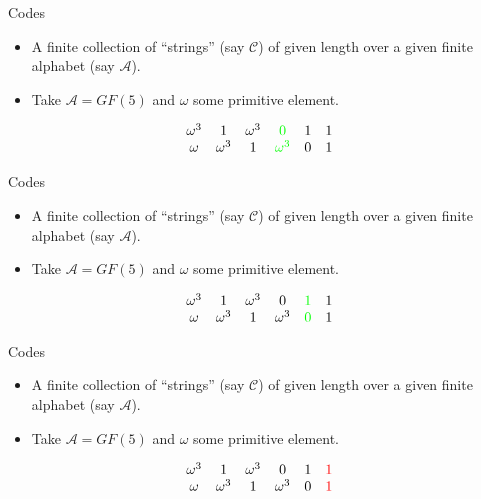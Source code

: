 \documentclass{beamer}
\newcommand{\A}{\mathcal{A}}
\newcommand{\C}{\mathscr{C}}
\newcommand{\rred}[1]{\textcolor{red}{#1}}
\newcommand{\ggreen}[1]{\textcolor{green}{#1}}
\begin{document}
 
  \begin{frame}{Codes}
 
 \begin{itemize}
  \item A finite collection of ``strings'' (say $\C$) of given length over a given finite alphabet (say $\A$).
  \item Take $\A = GF(5)$ and $\omega$ some primitive element.
 \end{itemize}
 
 \[
  \begin{array}{cccccc}
\omega^3 & 1 & \omega^3 & \ggreen{0} & 1 & 1 \\
\omega & \omega^3 & 1 & \ggreen{\omega^3} & 0 & 1
  \end{array}
 \]
 
 \end{frame}
 
 
  \begin{frame}{Codes}
 
 \begin{itemize}
  \item A finite collection of ``strings'' (say $\C$) of given length over a given finite alphabet (say $\A$).
  \item Take $\A = GF(5)$ and $\omega$ some primitive element.
 \end{itemize}
 
 \[
  \begin{array}{cccccc}
\omega^3 & 1 & \omega^3 & 0 & \ggreen{1} & 1 \\
\omega & \omega^3 & 1 & \omega^3 & \ggreen{0} & 1
  \end{array}
 \]
 
 \end{frame}
 
 
  \begin{frame}{Codes}
 
 \begin{itemize}
  \item A finite collection of ``strings'' (say $\C$) of given length over a given finite alphabet (say $\A$).
  \item Take $\A = GF(5)$ and $\omega$ some primitive element.
 \end{itemize}
 
 \[
  \begin{array}{cccccc}
\omega^3 & 1 & \omega^3 & 0 & 1 & \rred{1} \\
\omega & \omega^3 & 1 & \omega^3 & 0 & \rred{1}
  \end{array}
 \]
 
 \end{frame}
 
\end{document}
